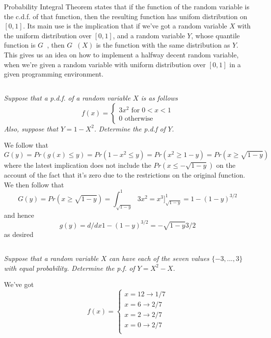 \documentclass[11pt,oneside,titlepage]{book}
\DeclareMathOperator \inv {^{-1}}
\newcommand{\set}[1]{\{ #1 \}}
\begin{document}
Probability Integral Theorem states that if the function of the random
variable is the c.d.f. of that function, then the resulting function
has unifom distribution on $[0, 1]$. Its main use is the implication
that if we've got a random variable $X$ with the uniform distribution
over $[0, 1]$, and a random variable $Y$, whose quantile function is
$G\inv$, then  $G\inv(X)$ is the function with the same distribution as
$Y$. This gives us an idea on how to implement a halfway decent random
variable, when we're given a random variable with uniform distribution
over $[0, 1]$ in a given programming environment.

\subsection{}

\textit{Suppose that a p.d.f. of a random variable $X$ is as follows}
$$
  f(x) = 
  \begin{cases}
    3x^2 \text{ for } 0 < x < 1 \\
    0 \text{ otherwise}
\end{cases}
$$
\textit{Also, suppose that $Y = 1 - X^2$. Determine the p.d.f of $Y$.}

We follow that
$$G(y) = Pr(g(x) \leq  y) = Pr(1 - x^2 \leq y) = Pr(x^2 \geq 1 - y) = Pr(x \geq \sqrt{1 - y})$$
where the latest implication does not include the $Pr(x \leq -\sqrt{1
- y})$ on the account of the fact that it's zero due to the
restrictions on the original function.
We then follow that
$$G(y) = Pr(x \geq \sqrt{1 - y}) = \int_{\sqrt{1 - y}}^{1}{3x^2} = x^3]^{1}_{\sqrt{1 - y}} = 1 - (1 - y)^{3/2}$$
and hence
$$g(y) = d/dx 1 - (1 - y)^{3/2} = -\sqrt{1 - y}3/2$$
as desired

\subsection{}

\textit{Suppose that a random variable $X$ can have each of the seven
  values $\set{-3, ..., 3}$ with equal probability. Determine the p.f.
  of $Y = X^2 - X$.}

We've got
$$f(x) =
\begin{cases}
  x = 12 \to 1/7 \\
  x = 6 \to 2/7 \\
  x = 2 \to 2/7 \\
  x = 0 \to 2/7 \\
\end{cases}
$$
\end{document}
